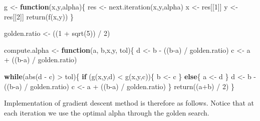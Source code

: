\documentclass[
]{article}
\newenvironment{Shaded}{\begin{snugshade}}{\end{snugshade}}
\newcommand{\ControlFlowTok}[1]{\textcolor[rgb]{0.13,0.29,0.53}{\textbf{#1}}}
\newcommand{\DecValTok}[1]{\textcolor[rgb]{0.00,0.00,0.81}{#1}}
\newcommand{\FunctionTok}[1]{\textcolor[rgb]{0.00,0.00,0.00}{#1}}
\newcommand{\NormalTok}[1]{#1}
\newcommand{\OtherTok}[1]{\textcolor[rgb]{0.56,0.35,0.01}{#1}}
\newcommand{\SpecialCharTok}[1]{\textcolor[rgb]{0.00,0.00,0.00}{#1}}
\begin{document}
\begin{Shaded}
\begin{Highlighting}[]
\NormalTok{g }\OtherTok{\textless{}{-}} \ControlFlowTok{function}\NormalTok{(x,y,alpha)\{}
\NormalTok{  res }\OtherTok{\textless{}{-}} \FunctionTok{next.iteration}\NormalTok{(x,y,alpha)}
\NormalTok{  x }\OtherTok{\textless{}{-}}\NormalTok{ res[[}\DecValTok{1}\NormalTok{]]}
\NormalTok{  y }\OtherTok{\textless{}{-}}\NormalTok{ res[[}\DecValTok{2}\NormalTok{]]}
  \FunctionTok{return}\NormalTok{(}\FunctionTok{f}\NormalTok{(x,y))}
\NormalTok{\}}

\NormalTok{golden.ratio }\OtherTok{\textless{}{-}}\NormalTok{ ((}\DecValTok{1} \SpecialCharTok{+} \FunctionTok{sqrt}\NormalTok{(}\DecValTok{5}\NormalTok{)) }\SpecialCharTok{/} \DecValTok{2}\NormalTok{)}

\NormalTok{compute.alpha }\OtherTok{\textless{}{-}} \ControlFlowTok{function}\NormalTok{(a, b,x,y, tol)\{}
\NormalTok{    d }\OtherTok{\textless{}{-}}\NormalTok{ b }\SpecialCharTok{{-}}\NormalTok{ ((b}\SpecialCharTok{{-}}\NormalTok{a) }\SpecialCharTok{/}\NormalTok{ golden.ratio)}
\NormalTok{    c }\OtherTok{\textless{}{-}}\NormalTok{ a }\SpecialCharTok{+}\NormalTok{ ((b}\SpecialCharTok{{-}}\NormalTok{a) }\SpecialCharTok{/}\NormalTok{ golden.ratio)}
    
    \ControlFlowTok{while}\NormalTok{(}\FunctionTok{abs}\NormalTok{(d }\SpecialCharTok{{-}}\NormalTok{ c) }\SpecialCharTok{\textgreater{}}\NormalTok{ tol)\{}
      \ControlFlowTok{if}\NormalTok{ (}\FunctionTok{g}\NormalTok{(x,y,d) }\SpecialCharTok{\textless{}} \FunctionTok{g}\NormalTok{(x,y,c))\{}
\NormalTok{        b }\OtherTok{\textless{}{-}}\NormalTok{ c}
\NormalTok{      \}}
      \ControlFlowTok{else}\NormalTok{\{}
\NormalTok{        a }\OtherTok{\textless{}{-}}\NormalTok{ d}
\NormalTok{      \}}
\NormalTok{      d }\OtherTok{\textless{}{-}}\NormalTok{ b }\SpecialCharTok{{-}}\NormalTok{ ((b}\SpecialCharTok{{-}}\NormalTok{a) }\SpecialCharTok{/}\NormalTok{ golden.ratio)}
\NormalTok{      c }\OtherTok{\textless{}{-}}\NormalTok{ a }\SpecialCharTok{+}\NormalTok{ ((b}\SpecialCharTok{{-}}\NormalTok{a) }\SpecialCharTok{/}\NormalTok{ golden.ratio)}
\NormalTok{    \}}
    \FunctionTok{return}\NormalTok{((a}\SpecialCharTok{+}\NormalTok{b) }\SpecialCharTok{/} \DecValTok{2}\NormalTok{)}
\NormalTok{\}}
\end{Highlighting}
\end{Shaded}

Implementation of gradient descent method is therefore as follows.
Notice that at each iteration we use the optimal alpha through the
golden search.
\end{document}
